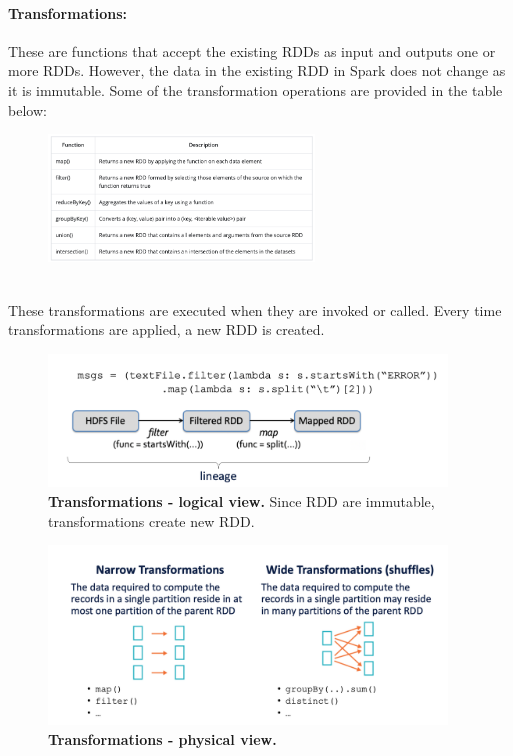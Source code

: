 \documentclass[10pt,a4paper]{article}
\begin{document}
 \paragraph{Transformations:} These are functions that accept the existing RDDs as input and outputs one or more RDDs. However, the data in the existing RDD in Spark does not change as it is immutable. Some of the transformation operations are provided in the table below:
   \begin{figure}[ht!]
 \hfill \includegraphics[width=200pt]{images/spark-rdd-transformation}
 \hspace*{\fill}
 \end{figure} \\
 These transformations are executed when they are invoked or called. Every time transformations are applied, a new RDD is created.
     \begin{figure}[ht!]
 \hfill \includegraphics[width=300pt]{images/spark-rdd-transformation-ex}
 \hspace*{\fill}
 \caption{\textbf{Transformations - logical view.} Since RDD are immutable, transformations create new RDD.}
 \end{figure} 
      \begin{figure}[ht!]
 \hfill \includegraphics[width=300pt]{images/spark-rdd-transformation-physical}
 \hspace*{\fill}
 \caption{\textbf{Transformations - physical view.}}
 \end{figure} 
\end{document}
